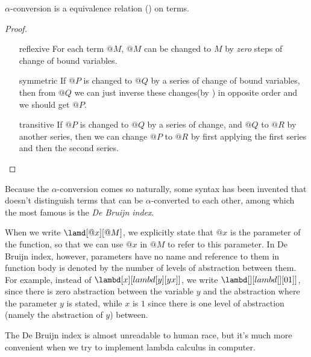 \documentclass[../../../include/open-logic-section]{subfiles}
\begin{document}
\begin{thm}
  $\alpha$-conversion is a equivalence relation () on terms.
\end{thm}
\begin{proof}
  
  \begin{enumerate}
    \item[reflexive] For each term $@M$, $@M$ can be changed to $M$ by
      \emph{zero} steps of change of bound variables.
    \item[symmetric] If $@P$ is changed to $@Q$ by a series of change
      of bound variables, then from $@Q$ we can just inverse these changes(by ) in
      opposite order and we should get $@P$.
    \item[transitive] If $@P$ is changed to $@Q$ by a series of
      change, and $@Q$ to $@R$ by another series, then we can change
      $@P$ to $@R$ by first applying the first series and then the
      second series.
  \end{enumerate}
\end{proof}

\begin{digress}
  Because the $\alpha$-conversion comes so naturally, some syntax has
  been invented that doesn't distinguish terms that can be
  $\alpha$-converted to each other, among which the most famous is the
  \emph{De Bruijn index}.
  
  When we write $\lamd[@x][@M]$, we explicitly state that $@x$ is the
  parameter of the function, so that we can use $@x$ in $@M$ to refer
  to this parameter. In De Bruijn index, however, parameters have no
  name and reference to them in function body is denoted by the number of levels of
  abstraction between them. For example, instead of $\lambd[x][lambd[y][y
  x]]$, we write $\lambd[][lambd[][0 1]]$, since there is zero
  abstraction between the variable $y$ and the abstraction where the
  parameter $y$ is stated, while $x$ is $1$ since there is one level
  of abstraction (namely the abstraction of $y$) between.

  The De Bruijn index is almost unreadable to human race, but it's
  much more convenient when we try to implement lambda calculus in
  computer. 
\end{digress}
\end{document}

